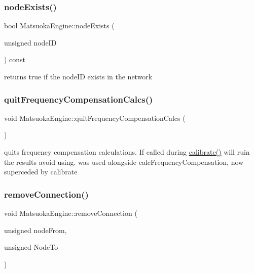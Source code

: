 \subsubsection{\texorpdfstring{node\+Exists()}{nodeExists()}}
{\footnotesize\ttfamily bool Matsuoka\+Engine\+::node\+Exists (\begin{DoxyParamCaption}\item[{unsigned}]{node\+ID }\end{DoxyParamCaption}) const}



returns true if the node\+ID exists in the network 

\mbox{\label{classMatsuokaEngine_a7937f29c227ad663eb153b01b11d307f}} 
\subsubsection{\texorpdfstring{quit\+Frequency\+Compensation\+Calcs()}{quitFrequencyCompensationCalcs()}}
{\footnotesize\ttfamily void Matsuoka\+Engine\+::quit\+Frequency\+Compensation\+Calcs (\begin{DoxyParamCaption}{ }\end{DoxyParamCaption})}

quits frequency compensation calculations. If called during \mbox{\hyperlink{classMatsuokaEngine_a68d6295dfa0d28e3bc9d743e763d6ee9}{calibrate()}} will ruin the results avoid using. was used alongside calc\+Frequency\+Compensation, now superceded by calibrate \mbox{\label{classMatsuokaEngine_a5a6d42576cafa238d020e62bdc9e2204}} 
\subsubsection{\texorpdfstring{remove\+Connection()}{removeConnection()}}
{\footnotesize\ttfamily void Matsuoka\+Engine\+::remove\+Connection (\begin{DoxyParamCaption}\item[{unsigned}]{node\+From,  }\item[{unsigned}]{Node\+To }\end{DoxyParamCaption})}



